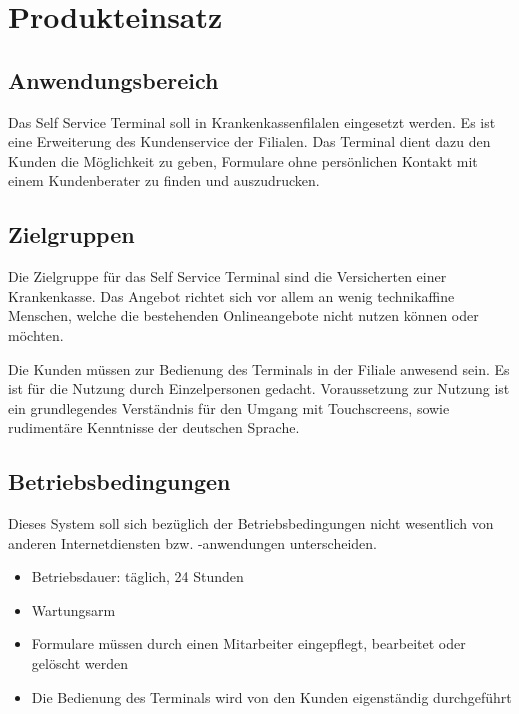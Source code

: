 \section{Produkteinsatz}

\vspace{1cm}

\subsection{Anwendungsbereich}

Das Self Service Terminal soll in Krankenkassenfilalen eingesetzt werden.
Es ist eine Erweiterung des Kundenservice der Filialen. Das Terminal dient dazu den Kunden die Möglichkeit zu geben, Formulare ohne persönlichen Kontakt mit einem Kundenberater zu finden und auszudrucken.

\vspace{1cm}

\subsection{Zielgruppen}

Die Zielgruppe für das Self Service Terminal sind die Versicherten einer Krankenkasse. Das Angebot richtet sich vor allem an wenig technikaffine Menschen, welche die bestehenden Onlineangebote nicht nutzen können oder möchten. 

\noindent Die Kunden müssen zur Bedienung des Terminals in der Filiale anwesend sein. Es ist für die Nutzung durch Einzelpersonen gedacht.
Voraussetzung zur Nutzung ist ein grundlegendes Verständnis für den Umgang mit Touchscreens, sowie rudimentäre Kenntnisse der deutschen Sprache.

\vspace{1cm}

\subsection{Betriebsbedingungen}

Dieses System soll sich bezüglich der Betriebsbedingungen nicht wesentlich von anderen Internetdiensten bzw. -anwendungen unterscheiden.

\begin{itemize}
  \item Betriebsdauer: täglich, 24 Stunden
  \item Wartungsarm
  \item Formulare müssen durch einen Mitarbeiter eingepflegt, bearbeitet oder gelöscht werden
 \item Die Bedienung des Terminals wird von den Kunden eigenständig durchgeführt
\end{itemize}
